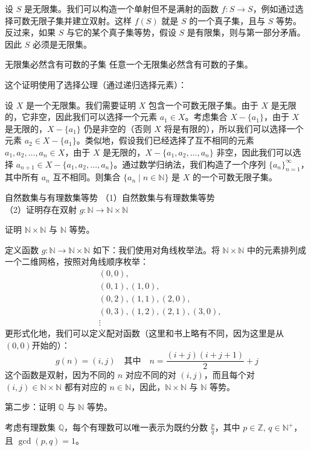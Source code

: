 设 $S$ 是无限集。我们可以构造一个单射但不是满射的函数 $f: S \to S$，例如通过选择可数无限子集并建立双射。这样 $f(S)$ 就是 $S$ 的一个真子集，且与 $S$ 等势。反过来，如果 $S$ 与它的某个真子集等势，假设 $S$ 是有限集，则与第一部分矛盾。因此 $S$ 必须是无限集。
\begin{theorem}{无限集必然含有可数的子集}{}
    任意一个无限集必然含有可数的子集。
\end{theorem}
这个证明使用了选择公理（通过递归选择元素）：

设 $X$ 是一个无限集。我们需要证明 $X$ 包含一个可数无限子集。由于 $X$ 是无限的，它非空，因此我们可以选择一个元素 $a_1 \in X$。考虑集合 $X -\{a_1\}$，由于 $X$ 是无限的，$X - \{a_1\}$ 仍是非空的（否则 $X$ 将是有限的），所以我们可以选择一个元素 $a_2 \in X - \{a_1\}$。类似地，假设我们已经选择了互不相同的元素 $a_1, a_2, \dots, a_n \in X$，由于 $X$ 是无限的，$X- \{a_1, a_2, \dots, a_n\}$ 非空，因此我们可以选择 $a_{n+1} \in X-\{a_1, a_2, \dots, a_n\}$。通过数学归纳法，我们构造了一个序列 $\{a_n\}_{n=1}^\infty$，其中所有 $a_n$ 互不相同。则集合 $\{a_n \mid n \in \mathbb{N}\}$ 是 $X$ 的一个可数无限子集。
\begin{theorem}{自然数集与有理数集等势}{}
    （1）自然数集与有理数集等势\\ 
    （2）证明存在双射 $g: \mathbb{N} \to \mathbb{N} \times \mathbb{N}$
\end{theorem}
证明 $\mathbb{N} \times \mathbb{N}$ 与 $\mathbb{N}$ 等势。

定义函数 $g: \mathbb{N} \to \mathbb{N} \times \mathbb{N}$ 如下：我们使用对角线枚举法。将 $\mathbb{N} \times \mathbb{N}$ 中的元素排列成一个二维网格，按照对角线顺序枚举：
\begin{align*}
&(0,0), \\
&(0,1), (1,0), \\
&(0,2), (1,1), (2,0), \\
&(0,3), (1,2), (2,1), (3,0), \\
&\vdots
\end{align*}
更形式化地，我们可以定义配对函数（这里和书上略有不同，因为这里是从$(0,0)$开始的）：
\[
g(n) = (i,j) \quad \text{其中} \quad n = \frac{(i+j)(i+j+1)}{2} + j
\]
这个函数是双射，因为不同的 $n$ 对应不同的对 $(i,j)$，而且每个对 $(i,j) \in \mathbb{N} \times \mathbb{N}$ 都有对应的 $n \in \mathbb{N}$，因此，$\mathbb{N} \times \mathbb{N}$ 与 $\mathbb{N}$ 等势。

第二步：证明 $\mathbb{Q}$ 与 $\mathbb{N}$ 等势。

考虑有理数集 $\mathbb{Q}$，每个有理数可以唯一表示为既约分数 $\frac{p}{q}$，其中 $p \in \mathbb{Z}$, $q \in \mathbb{N}^+$，且 $\gcd(p,q) = 1$。

